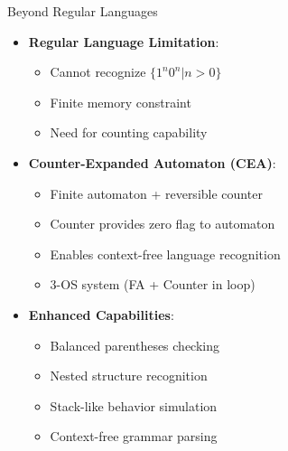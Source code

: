 \documentclass[aspectratio=169,11pt]{beamer}
\newcommand{\concept}[1]{\textbf{\color{accentcolor}#1}}
\begin{document}
\begin{frame}{Beyond Regular Languages}
\begin{itemize}
\item \concept{Regular Language Limitation}:
\begin{itemize}
\item Cannot recognize $\{1^n0^n | n > 0\}$
\item Finite memory constraint
\item Need for counting capability
\end{itemize}
\vspace{0.5cm}
\item \concept{Counter-Expanded Automaton (CEA)}:
\begin{itemize}
\item Finite automaton + reversible counter
\item Counter provides zero flag to automaton
\item Enables context-free language recognition
\item 3-OS system (FA + Counter in loop)
\end{itemize}
\vspace{0.3cm}
\item \concept{Enhanced Capabilities}:
\begin{itemize}
\item Balanced parentheses checking
\item Nested structure recognition
\item Stack-like behavior simulation
\item Context-free grammar parsing
\end{itemize}
\end{itemize}
\end{frame}
\end{document}
